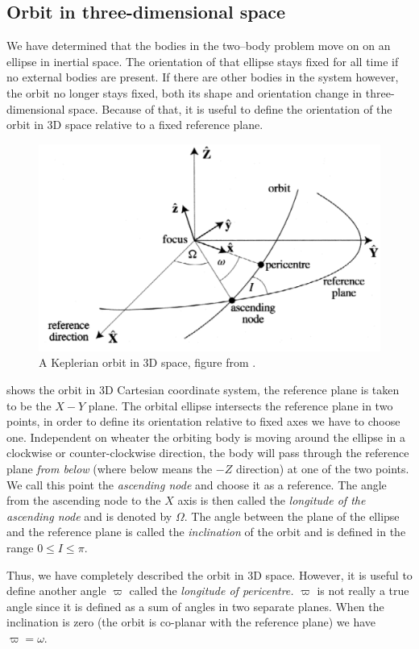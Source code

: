\documentclass[twoside,openright,titlepage,numbers=noenddot,headinclude,%
                footinclude=true,cleardoublepage=empty,abstractoff, 
                BCOR=5mm,paper=a4,fontsize=11pt,%
                american,%
                ]{scrreprt}%
\begin{document}
\subsection{Orbit in three-dimensional space}
We have determined that the bodies in the two--body problem move on
on an ellipse in inertial space. The orientation of that ellipse 
stays fixed for all time if no external bodies are present. If there 
are other bodies in the system however, the orbit no longer stays
fixed, both its shape and orientation change in three-dimensional space.
Because of that, it is useful to define the orientation of the orbit
in 3D space relative to a fixed reference plane.
\begin{figure}[htb]
\centering
\includegraphics[width=0.8\linewidth]{gfx/3d_orbit.png}
    \caption[Orbit in 3D space.]{A Keplerian orbit in 3D space, figure
    from \citet{murray}.}
\label{fig:3d_orbit}
\end{figure}
 shows the orbit in 3D Cartesian coordinate system,
the reference plane is taken to be the $X-Y$ plane. The orbital
ellipse intersects the reference plane in two points, in order to define
its orientation relative to fixed axes we have to choose one. Independent
on wheater the orbiting body is moving around the ellipse in a clockwise
or counter-clockwise direction, the body will pass through the reference
plane \emph{from below} (where below means the $-Z$ direction)
at one of the two points. We call this point the \emph{ascending node}
and choose it as a reference. The angle from the ascending node to the
$X$ axis is then called the \emph{longitude of the ascending node} and
is denoted by $\Omega$. The angle between the plane of the ellipse and
the reference plane is called the \emph{inclination} of the orbit and
is defined in the range $0\leq I\leq \pi$.

Thus, we have completely described the orbit in 3D space. However, it is useful to 
define another angle $\varpi$ called the \emph{longitude of pericentre.} 
$\varpi$ is not really a true angle since it is defined as a sum of 
angles in two separate planes. When the inclination is zero (the orbit
is co-planar with the reference plane) we have $\varpi=\omega$. 
\end{document}
